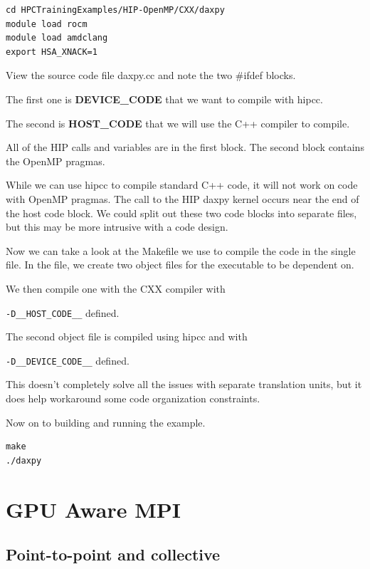 \documentclass[
]{article}
\let\oldtexttt\texttt
\renewcommand{\texttt}[1]{
  \colorbox{Light}{\oldtexttt{#1}}
}
\begin{document}
\begin{verbatim}
cd HPCTrainingExamples/HIP-OpenMP/CXX/daxpy
module load rocm
module load amdclang
export HSA_XNACK=1
\end{verbatim}

View the source code file daxpy.cc and note the two \#ifdef blocks.

The first one is \textbf{DEVICE\_CODE} that we want to compile with
hipcc.

The second is \textbf{HOST\_CODE} that we will use the C++ compiler to
compile.

All of the HIP calls and variables are in the first block. The second
block contains the OpenMP pragmas.

While we can use hipcc to compile standard C++ code, it will not work on
code with OpenMP pragmas. The call to the HIP daxpy kernel occurs near
the end of the host code block. We could split out these two code blocks
into separate files, but this may be more intrusive with a code design.

Now we can take a look at the Makefile we use to compile the code in the
single file. In the file, we create two object files for the executable
to be dependent on.

We then compile one with the CXX compiler with
\texttt{-D\_\_HOST\_CODE\_\_} defined.

The second object file is compiled using hipcc and with
\texttt{-D\_\_DEVICE\_CODE\_\_} defined.

This doesn't completely solve all the issues with separate translation
units, but it does help workaround some code organization constraints.

Now on to building and running the example.

\begin{verbatim}
make
./daxpy
\end{verbatim}

\pagebreak

\hypertarget{gpu-aware-mpi}{%
\section{GPU Aware MPI}\label{gpu-aware-mpi}}

\hypertarget{point-to-point-and-collective}{%
\subsection{Point-to-point and
collective}\label{point-to-point-and-collective}}
\end{document}
